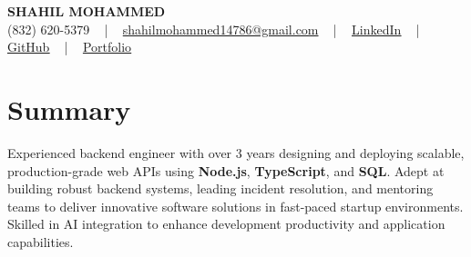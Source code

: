 \documentclass[letterpaper,10pt]{article}
\begin{document}
\begin{center}
    {\fontsize{14pt}{12pt}\selectfont \textbf{\MakeUppercase{Shahil Mohammed}}}\\ \vspace{2pt}
    \fontsize{10pt}{12pt}\selectfont (832) 620-5379 ~ | ~ \href{mailto:shahilmohammed14786@gmail.com}{shahilmohammed14786@gmail.com} ~ | ~  
    \href{https://www.linkedin.com/in/shahil-mohammed-9652931a1/}{\color{blue}\underline{LinkedIn}}  ~ | ~ 
    \href{https://github.com/freakbeast14}{\color{blue}\underline{GitHub}} ~ | ~ 
    \href{https://shahil-mohammed.netlify.app/}{\color{blue}\underline{Portfolio}}
    \vspace{-8pt}
\end{center}

\section{Summary}
\vspace{-2pt}\fontsize{8pt}{9pt}\selectfont
Experienced backend engineer with over 3 years designing and deploying scalable, production-grade web APIs using \textbf{Node.js}, \textbf{TypeScript}, and \textbf{SQL}. Adept at building robust backend systems, leading incident resolution, and mentoring teams to deliver innovative software solutions in fast-paced startup environments. Skilled in AI integration to enhance development productivity and application capabilities.
 \vspace{-5pt}
 
\vspace{-2pt}
\end{document}
